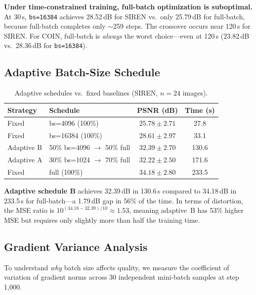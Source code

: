 \documentclass[a4paper,oneside,11pt,english]{scrartcl}
\begin{document}
\textbf{Under time-constrained training, full-batch optimization is
suboptimal.}  At 30\,s, \texttt{bs=16384} achieves 28.52\,dB for SIREN vs.\
only 25.79\,dB for full-batch, because full-batch completes only $\sim$259
steps.  The crossover occurs near 120\,s for SIREN.  For COIN, full-batch
is \emph{always} the worst choice---even at 120\,s (23.82\,dB vs.\ 28.36\,dB
for \texttt{bs=16384}).

\subsection{Adaptive Batch-Size Schedule}
\label{sec:adaptive_schedule}

\begin{table}[H]
\centering
\caption{Adaptive schedules vs.\ fixed baselines (SIREN, $n=24$ images).}
\label{tab:adaptive}
\begin{tabular}{llcc}
\toprule
Strategy & Schedule & PSNR (dB) & Time (s) \\
\midrule
Fixed & bs=4096 (100\%) & $25.78 \pm 2.71$ & 27.8 \\
Fixed & bs=16384 (100\%) & $28.61 \pm 2.97$ & 33.1 \\
\midrule
Adaptive B & 50\% bs=4096 $\to$ 50\% full & $\mathbf{32.39 \pm 2.70}$ & 130.6 \\
Adaptive A & 30\% bs=1024 $\to$ 70\% full & $32.22 \pm 2.50$ & 171.6 \\
\midrule
Fixed & full (100\%) & $34.18 \pm 2.80$ & 233.5 \\
\bottomrule
\end{tabular}
\end{table}

\textbf{Adaptive schedule B} achieves 32.39\,dB in 130.6\,s compared to
34.18\,dB in 233.5\,s for full-batch---a 1.79\,dB gap in 56\% of the time.
In terms of distortion, the MSE ratio is $10^{(34.18-32.39)/10} \approx 1.53$,
meaning adaptive~B has 53\% higher MSE but requires only slightly more than
half the training time.

\subsection{Gradient Variance Analysis}
\label{sec:grad_variance}

To understand \emph{why} batch size affects quality, we measure the coefficient
of variation of gradient norms across 30 independent mini-batch samples at
step 1{,}000.
\end{document}
